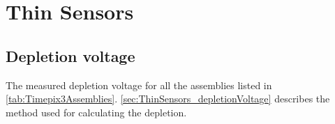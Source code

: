 \chapter{Thin Sensors}
\label{sec:appendix_ThinSensors}

\section{Depletion voltage}

The measured depletion voltage for all the assemblies listed in
\cref{tab:Timepix3Assemblies}. \cref{sec:ThinSensors_depletionVoltage}
describes the method used for calculating the depletion.

